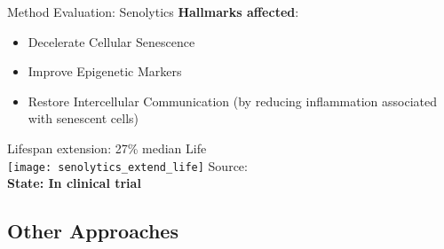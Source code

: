 


\begin{frame}[c]{Method Evaluation: Senolytics}
    \textbf{Hallmarks affected}: \\
    \begin{itemize}[<+(1)->]
        \item Decelerate Cellular Senescence
        \item Improve Epigenetic Markers
        \item Restore Intercellular Communication (by reducing inflammation associated with senescent cells)
    \end{itemize}
    \pause
    Lifespan extension: 27\% median Life\\
    \texttt{[image: senolytics\_extend\_life]}
    \scriptsize
    Source: \cite{baker2016naturally} \\
    \normalsize
    \pause
    \textbf{State: In clinical trial}
\end{frame}


\subsection{Other Approaches}

